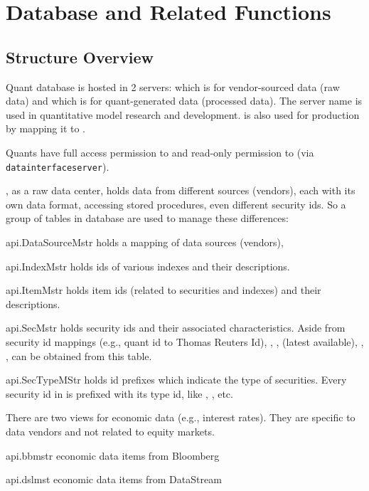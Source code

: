 \section{Database and Related Functions\label{sec:DBIO}}

\subsection{Structure Overview}

Quant database is hosted in 2 servers: 
 which is for vendor-sourced data (raw data)
and  which is for quant-generated data (processed data).
The server name  is used in quantitative model research and development.
 is also used for production
by mapping it to .

Quants have full access permission to 
and read-only permission to   (via \texttt{data\allowbreak{}interfaceserver}).

, as a raw data center, 
holds data from different sources (vendors),
each with its own data format, accessing stored procedures, 
even different security ids.
So a group of tables in database  are used to manage these differences:

\begin{argdesc}
  \item [api.DataSourceMstr] holds a mapping of data sources (vendors), 
  \item [api.IndexMstr] holds ids of various indexes and their descriptions.
  \item [api.ItemMstr]  holds item ids (related to securities and indexes) and their descriptions.	
  \item [api.SecMstr] holds security ids and their associated characteristics.
        Aside from security id mappings (e.g., quant id to Thomas Reuters Id),
        , ,  (latest available),
        , ,  can be obtained from this table.
  \item [api.SecTypeMStr] holds id prefixes which indicate the type of securities.
        Every security id in  is prefixed with its type id,
        like , , etc.
\end{argdesc}

There are two views for economic data (e.g., interest rates). 
They are specific to data vendors and not related to equity markets.
\begin{argdesc}
  \item [api.bbmstr] economic data items from Bloomberg
  \item [api.dslmst] economic data items from DataStream
\end{argdesc}

